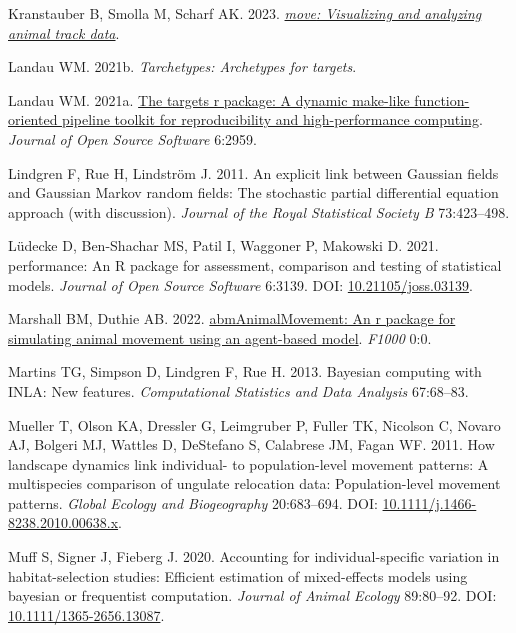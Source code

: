 \documentclass[10pt,a4paper]{article}
\newlength{\cslhangindent}
\newenvironment{CSLReferences}[2] %
 {\begin{list}{}{%
  \setlength{\itemindent}{0pt}
  \setlength{\leftmargin}{0pt}
  \setlength{\parsep}{0pt}
  \ifodd #1
   \setlength{\leftmargin}{\cslhangindent}
   \setlength{\itemindent}{-1\cslhangindent}
  \fi
  \setlength{\itemsep}{#2\baselineskip}}}
 {\end{list}}
\begin{document}
\begin{CSLReferences}{1}{0}
Kranstauber B, Smolla M, Scharf AK. 2023. \emph{\href{https://CRAN.R-project.org/package=move}{{move}: Visualizing and analyzing animal track data}}.

Landau WM. 2021b. \emph{Tarchetypes: Archetypes for targets}.

Landau WM. 2021a. \href{https://doi.org/10.21105/joss.02959}{The targets r package: A dynamic make-like function-oriented pipeline toolkit for reproducibility and high-performance computing}. \emph{Journal of Open Source Software} 6:2959.

Lindgren F, Rue H, Lindström J. 2011. An explicit link between {Gaussian} fields and {Gaussian} {Markov} random fields: The stochastic partial differential equation approach (with discussion). \emph{Journal of the Royal Statistical Society B} 73:423--498.

Lüdecke D, Ben-Shachar MS, Patil I, Waggoner P, Makowski D. 2021. {performance}: An {R} package for assessment, comparison and testing of statistical models. \emph{Journal of Open Source Software} 6:3139. DOI: \href{https://doi.org/10.21105/joss.03139}{10.21105/joss.03139}.

Marshall BM, Duthie AB. 2022. \href{https://0}{{abmAnimalMovement}: An r package for simulating animal movement using an agent-based model}. \emph{F1000} 0:0.

Martins TG, Simpson D, Lindgren F, Rue H. 2013. Bayesian computing with {INLA}: {N}ew features. \emph{Computational Statistics and Data Analysis} 67:68--83.

Mueller T, Olson KA, Dressler G, Leimgruber P, Fuller TK, Nicolson C, Novaro AJ, Bolgeri MJ, Wattles D, DeStefano S, Calabrese JM, Fagan WF. 2011. How landscape dynamics link individual- to population-level movement patterns: A multispecies comparison of ungulate relocation data: {Population}-level movement patterns. \emph{Global Ecology and Biogeography} 20:683--694. DOI: \href{https://doi.org/10.1111/j.1466-8238.2010.00638.x}{10.1111/j.1466-8238.2010.00638.x}.

Muff S, Signer J, Fieberg J. 2020. Accounting for individual-specific variation in habitat-selection studies: Efficient estimation of mixed-effects models using bayesian or frequentist computation. \emph{Journal of Animal Ecology} 89:80--92. DOI: \href{https://doi.org/10.1111/1365-2656.13087}{10.1111/1365-2656.13087}.


\end{CSLReferences}
\end{document}
